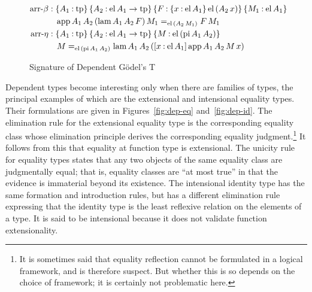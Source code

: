 \documentclass[11pt,twoside]{article}
\newcommand{\braces}[1]{\{#1\}}
\newcommand{\bracks}[1]{[#1]}
\newcommand{\parens}[1]{(#1)}
\newcommand{\const}[1]{\text{#1}}
\newcommand{\eqclass}[3]{{#2}=_{#1}{#3}}
\newcommand{\piclass}[3]{\braces{{#2}\mathbin{:}{#1}}\,{#3}}
\newcommand{\arrclass}[2]{{#1}\to{#2}}
\newcommand{\lamobj}[3]{\bracks{{#2}\mathbin{:}{#1}}\,{#3}}
\newcommand{\appobj}[2]{{#1}\,{#2}}
\begin{document}
\begin{figure}
\begin{align*}
%
    \betacon
    & :
      \piclass{\tpsort}{A_{1}}{
      \piclass{\arrclass{\elof{A_{1}}}{\tpsort}}{A_{2}}{
      \piclass{\piclass{\elof{A_{1}}}{x}{\elofp{\appobj{A_{2}}{x}}}}{F}{
      \piclass{\elof{A_{1}}}{M_{1}}{
      }}}} \\
    & \quad
      \eqclass{\elofp{\appobj{A_{2}}{M_{1}}}}
      {\appof{A_{1}}{A_{2}}{\parens{\lamof{A_{1}}{A_{2}}{F}}}{M_{1}}}
      {\appobj{F}{M_{1}}} \\
    \etacon
    & :
      \piclass{\tpsort}{A_{1}}{
      \piclass{\arrclass{\elof{A_{1}}}{\tpsort}}{A_{2}}{
      \piclass{\elofp{\piof{A_{1}}{A_{2}}}}{M}{
      }}} \\
    & \quad
      \eqclass{\elofp{\piof{A_{1}}{A_{2}}}}
      {M}
      {\lamof{A_{1}}{A_{2}}{\parens{\lamobj{\elof{A_{1}}}{x}{\appof{A_{1}}{A_{2}}{M}{x}}}}}
  \end{align*}

  \caption{Signature of Dependent G\"odel's T}
  \label{fig:t-sig-dep}
\end{figure}

Dependent types become interesting only when there are families of types, the principal
examples of which are the extensional and intensional equality types.  Their formulations
are given in Figures~\ref{fig:dep-eq} and~\ref{fig:dep-id}.  The elimination rule for the
extensional equality type is the corresponding equality class whose elimination principle
derives the corresponding equality judgment.\footnote{It is sometimes said that equality
  reflection cannot be formulated in a logical framework, and is therefore suspect.  But
  whether this is so depends on the choice of framework; it is certainly not problematic
  here.}  It follows from this that equality at function type is extensional.  The unicity
rule for equality types states that any two objects of the same equality class are
judgmentally equal; that is, equality classes are ``at most true'' in that the evidence is
immaterial beyond its existence.  The intensional identity type has the same formation and
introduction rules, but has a different elimination rule expressing that the identity type
is the least reflexive relation on the elements of a type.  It is said to be intensional
because it does not validate function extensionality.

\newcommand{\eqcon}{\const{eq}}
\newcommand{\eqof}[3]{\appobj{\appobj{\appobj{\eqcon}{#1}}{#2}}{#3}}
\newcommand{\selfcon}{\const{star}}
\newcommand{\selfof}[2]{\appobj{\appobj{\selfcon}{#1}}{#2}}
\newcommand{\eqrefcon}{\const{eqref}}
\newcommand{\equnicon}{\const{equni}}
\end{document}

